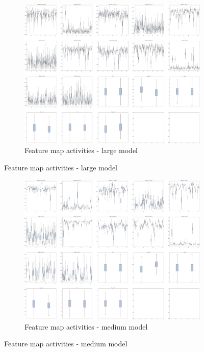 \begin{figure}
    \centering
    \begin{subfigure}{.95\textwidth}
        \centering
        \includegraphics[width=\textwidth]{images/sparseness/encoder_fm1_fms.png}
        \caption{Feature map activities - large model}
    \end{subfigure}
\end{figure}
\begin{figure}
    \ContinuedFloat
    \centering
    \begin{subfigure}{.95\textwidth}
        \centering
        \includegraphics[width=\textwidth]{images/sparseness/encoder_fm2_fms.png}
        \caption{Feature map activities - medium model}
    \end{subfigure}
\end{figure}
